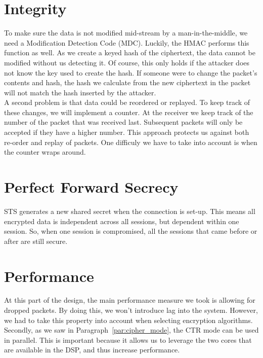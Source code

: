 \documentclass[a4paper]{article}
\begin{document}
\section{Integrity}

To make sure the data is not modified mid-stream by a man-in-the-middle, we need a Modification Detection Code (MDC). Luckily, the HMAC performs this function as well. As we create a keyed hash of the ciphertext, the data cannot be modified without us detecting it. Of course, this only holds if the attacker does not know the key used to create the hash. If someone were to change the packet's contents and hash, the hash we calculate from the new ciphertext in the packet will not match the hash inserted by the attacker.\\

A second problem is that data could be reordered or replayed. To keep track of these changes, we will implement a counter. At the receiver we keep track of the number of the packet that was received last. Subsequent packets will only be accepted if they have a higher number. This approach protects us against both re-order and replay of packets. One difficuly we have to take into account is when the counter wraps around.

\section{Perfect Forward Secrecy}

STS generates a new shared secret when the connection is set-up. This means all encrypted data is independent across all sessions, but dependent within one session. So, when one session is compromised, all the sessions that came before or after are still secure.

\section{Performance}

At this part of the design, the main performance measure we took is allowing for dropped packets. By doing this, we won't introduce lag into the system. However, we had to take this property into account when selecting encryption algorithms.\\

Secondly, as we saw in Paragraph~\ref{par:cipher_mode}, the CTR mode can be used in parallel. This is important because it allows us to leverage the two cores that are available in the DSP, and thus increase performance.
\end{document}
